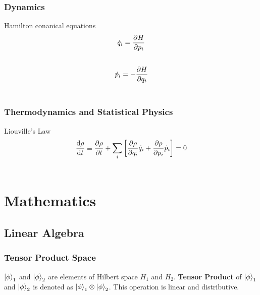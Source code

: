\documentclass[letterpaper,10pt,english]{sphinxmanual}
\begin{document}
\subsubsection{Dynamics}
\label{Basic:dynamics}
Hamilton conanical equations
\begin{gather}
\begin{split}\dot q_i = \frac{\partial H}{\partial p_i}\end{split}\notag\\\begin{split}\end{split}\notag
\end{gather}\begin{gather}
\begin{split}\dot p_i = - \frac{\partial H}{\partial q_i}\end{split}\notag\\\begin{split}\end{split}\notag
\end{gather}

\subsubsection{Thermodynamics and Statistical Physics}
\label{Basic:thermodynamics-and-statistical-physics}
Liouville's Law
\begin{gather}
\begin{split}\frac{\mathrm d \rho}{\mathrm d t}\equiv \frac{\partial \rho}{\partial t} + \sum_i \left[ \frac{\partial \rho}{\partial q_i}\dot q_i + \frac{\partial \rho}{\partial p_i}\dot p_i \right] = 0\end{split}\notag\\\begin{split}\end{split}\notag
\end{gather}

\section{Mathematics}
\label{math:mathematics}\label{math::doc}

\subsection{Linear Algebra}
\label{math:linear-algebra}

\subsubsection{Tensor Product Space}
\label{math:tensorproductspace}\label{math:tensor-product-space}
$\ket{\phi}_1$ and $\ket{\phi}_2$ are elements of Hilbert space $H_1$ and $H_2$. \textbf{Tensor Product} of $\ket{\phi}_1$ and $\ket{\phi}_2$ is denoted as $\ket{\phi}_1\otimes \ket{\phi}_2$. This operation is linear and distributive.
\end{document}
